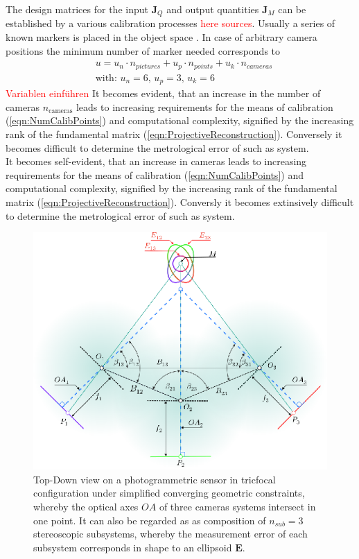 \documentclass[5p,times,procedia]{elsarticle}
\begin{document}
The design matrices for the input $\mathbf{J}_{Q}$ and output quantities $\mathbf{J}_{M}$ can be established by a various calibration processes \textcolor{red}{here sources}. Usually a series of known markers is placed in the object space \cite{Luhmann2003}. In case of arbitrary camera positions the minimum number of marker needed corresponds to
\begin{equation}
	\label{eqn:NumCalibPoints}
	\begin{aligned}
		& 	u = u_n \cdot n_{pictures} + u_p \cdot n_{points} + u_k \cdot n_{cameras} \\
		& \text{with: } u_n = 6\text{, } u_p = 3\text{, } u_k = 6 
	\end{aligned}
\end{equation}
\textcolor{red}{Variablen einführen}
It becomes evident, that an increase in the number of cameras $n_{\text{cameras}}$ leads to increasing requirements for the means of calibration (\ref{eqn:NumCalibPoints}) and computational complexity, signified by the increasing rank of the fundamental matrix (\ref{eqn:ProjectiveReconstruction}). Conversely it becomes difficult to determine the metrological error of such as system.\\

It becomes self-evident, that an increase in cameras leads to increasing requirements for the means of calibration (\ref{eqn:NumCalibPoints}) and computational complexity, signified by the increasing rank of the fundamental matrix (\ref{eqn:ProjectiveReconstruction}). Conversly it becomes extinsively difficult to determine the metrological error 
of such as system.\\

\begin{figure}[h]
	\centering
	\includegraphics[width=0.8\linewidth]{graphics/MixedErrorCuttingGeometry.eps}
	\caption{Top-Down view on a photogrammetric sensor in tricfocal configuration under simplified converging geometric constraints, whereby the optical axes $OA$ of three cameras systems intersect in one point.		
	It can also be regarded as as composition of $n_{sub}=3$ stereoscopic subsystems, whereby the measurement error of each subsystem corresponds in shape to an ellipsoid $\mathbf{E}$.}
	\label{fig:sub_sensors}
\end{figure}
\end{document}
